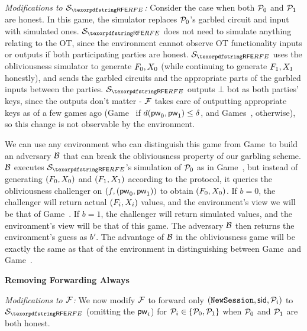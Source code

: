 \begin{games}
\textit{Modifications to $\SimYGCRFE$:}
Consider the case when both $\mathcal{P}_{0}$ and $\mathcal{P}_{1}$ are honest.
In this game, the simulator replaces $\mathcal{P}_{0}$'s garbled circuit and input with simulated ones.
$\SimYGCRFE$ does not need to simulate anything relating to the OT, since the environment cannot observe OT functionality inputs or outputs if both participating parties are honest.
$\SimYGCRFE$ uses the obliviousness simulator to generate $F_{0}, X_{0}$ (while continuing to generate $F_{1}, X_{1}$ honestly), and sends the garbled circuits and the appropriate parts of the garbled inputs between the parties.
$\SimYGCRFE$ outputs $\bot$ bot as both parties' keys, since the outputs don't matter - $\mathcal{F}$ takes care of outputting appropriate keys as of a few games ago (Game~ if $d(\mathsf{pw}_{0}, \mathsf{pw}_{1}) \leq \delta$, and Games~, otherwise), so this change is not observable by the environment.

We can use any environment who can distinguish this game from Game~\previousgame to build an adversary $\mathcal{B}$ that can break the obliviousness property %
of our garbling scheme.
$\mathcal{B}$ executes $\SimYGCRFE$'s simulation of $\mathcal{P}_{0}$ as in Game~\previousgame, but instead of generating $(F_{0}, X_{0})$ and $(F_{1}, X_{1})$ according to the protocol, it queries the obliviousness challenger on $(f, (\mathsf{pw}_{0}, \mathsf{pw}_{1}))$ to obtain $(F_{0}, X_{0})$.
If $b = 0$, the challenger will return actual $(F_i, X_i)$ values, and the environment's view we will be that of Game~\previousgame.
If $b = 1$, the challenger will return simulated values, and the environment's view will be that of this game.
The adversary $\mathcal{B}$ then returns the environment's guess as $b'$.
The advantage of $\mathcal{B}$ in the obliviousness game will be exactly the same as that of the environment in distinguishing between Game~\previousgame and Game~\thisgame.

\textbf{Removing \Password Forwarding Always}

\textit{Modifications to $\mathcal{F}$:}
We now modify $\mathcal{F}$ to forward only $(\texttt{NewSession}, \mathsf{sid}, \mathcal{P}_{i})$ to $\SimYGCRFE$ (omitting the \password $\mathsf{pw}_{i}$) for $\mathcal{P}_{i} \in \{\mathcal{P}_{0}, \mathcal{P}_{1}\}$ when $\mathcal{P}_{0}$ and $\mathcal{P}_{1}$ are both honest. 


\end{games}
